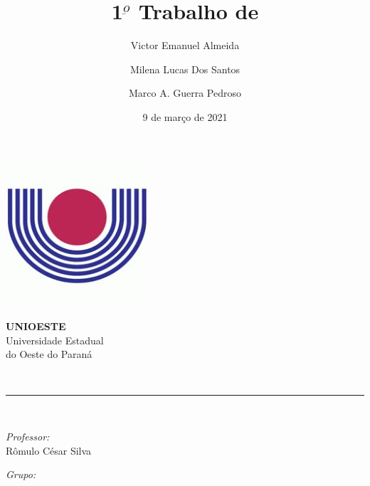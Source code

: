 \documentclass[12pt, a4paper]{article}
\author{Victor Emanuel Almeida\and Milena Lucas Dos Santos\and Marco A. Guerra Pedroso}
\title{1$^{\underbar{o}}$ Trabalho de \materia}
\date{9 de março de 2021}
\newcommand{\prof}{Rômulo César Silva}
\begin{document}
\begin{titlepage}
    \centering
    \thispagestyle{fancy}

    \begin{minipage}{0.4\textwidth}
        \begin{flushleft}
            \includegraphics[scale=0.6]{logoUnioeste.jpeg}\\[1.0 cm]
        \end{flushleft}
    \end{minipage}
    \begin{minipage}{0.5\textwidth}
        \begin{flushright}\large
            \textsc{\LARGE\textbf{UNIOESTE}}\\
            \vspace{1cm}
            Universidade Estadual\\do Oeste do Paraná
        \end{flushright}
    \end{minipage}
    \vspace*{4.5 cm}

    {\huge\bfseries\thetitle}\\
    \rule{\linewidth}{0.2 mm}\\[1.5 cm]

    \vspace{2cm}
    \begin{minipage}[t]{0.4\textwidth}
        \begin{flushleft}\large
            \emph{Professor:}\\
            \prof\\
        \end{flushleft}
    \end{minipage}
    \begin{minipage}[t]{0.5\textwidth}

        \begin{flushright}\large
            \emph{Grupo:}\\
            \theauthor
        \end{flushright}

    \end{minipage}\\[2 cm]

    \vfill\thedate
\end{titlepage}
\end{document}
